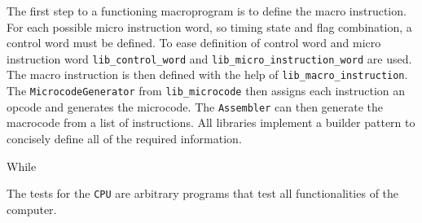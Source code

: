 The first step to a functioning macroprogram is to define the macro instruction. For each possible micro instruction word, so timing state and flag combination, a control word must be defined. To ease definition of control word and micro instruction word \texttt{lib\_control\_word} and \texttt{lib\_micro\_instruction\_word} are used. The macro instruction is then defined with the help of \texttt{lib\_macro\_instruction}. The \texttt{MicrocodeGenerator} from \texttt{lib\_microcode} then assigns each instruction an opcode and generates the microcode. The \texttt{Assembler} can then generate the macrocode from a list of instructions. All libraries implement a builder pattern to concisely define all of the required information.

While

The tests for the \texttt{CPU} are arbitrary programs that test all functionalities of the computer.
